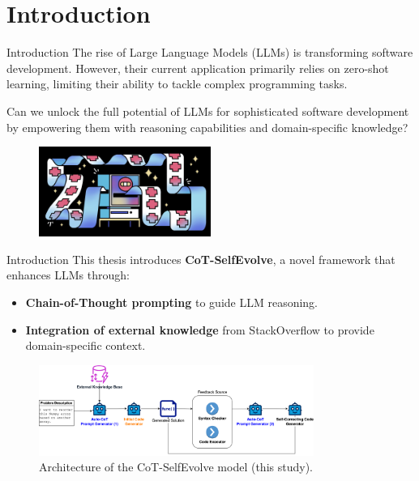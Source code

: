 \section{Introduction}

\begin{frame}{Introduction}
    The rise of Large Language Models (LLMs) is transforming software development. However, their current application primarily relies on zero-shot learning, limiting their ability to tackle complex programming tasks.

    \vspace{0.5cm}

    Can we unlock the full potential of LLMs for sophisticated software development by empowering them with reasoning capabilities and domain-specific knowledge?

    \begin{figure}[!htb]
        \centering
        \includegraphics[width=0.5\textwidth]{img/llm_for_coding}
    \end{figure}
\end{frame}

\begin{frame}{Introduction}
    This thesis introduces \textbf{CoT-SelfEvolve}, a novel framework that enhances LLMs through:

    \begin{itemize}
        \item \textbf{Chain-of-Thought prompting} to guide LLM reasoning.
        \item \textbf{Integration of external knowledge} from StackOverflow to provide domain-specific context.
    \end{itemize}

    \begin{figure}[!htb]
        \centering
        \includegraphics[width=0.8\textwidth]{img/cot_selfevolve_architecture}
        \captionsetup{font=small,labelformat=empty}
        \caption{Architecture of the CoT-SelfEvolve model (this study).}
    \end{figure}
\end{frame}
